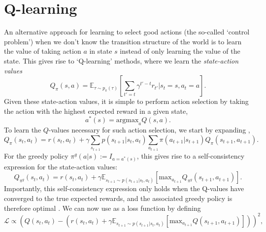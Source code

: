 \section{Q-learning}
\label{sec:q_learning}



An alternative approach for learning to select good actions (the so-called `control problem') when we don't know the transition structure of the world is to learn the value of taking action $a$ in state $s$ instead of only learning the value of the state.
This gives rise to `Q-learning' methods, where we learn the \emph{state-action values}
\begin{equation}
    \label{eq:Q-values}
    Q_\pi(s,a) =  \mathbb{E}_{\tau \sim p_\pi(\tau)} \left [ \sum_{t'=t} \gamma^{t' - t} r_{t'} | s_{t} = s, a_{t} = a \right ].
\end{equation}
Given these state-action values, it is simple to perform action selection by taking the action with the highest expected reward in a given state,
\begin{equation}
    a^*(s) = \text{argmax}_{a} Q(s, a).
\end{equation}
To learn the $Q$-values necessary for such action selection, we start by expanding ,
\begin{equation}
    \label{eq:Q-expanded}
    Q_\pi(s_t,a_t) =  r(s_t, a_t) + \gamma \sum_{s_{t+1}} p(s_{t+1} | s_t, a_t) \sum_{a_{t+1}} \pi(a_{t+1} | s_{t+1}) Q_\pi(s_{t+1}, a_{t+1}).
\end{equation}
For the greedy policy $\pi^g(a|s) := I_{a = a^*(s)}$, this gives rise to a self-consistency expression for the state-action values:
\begin{equation}
    \label{eq:Q-optimal}
    Q_{\pi^g}(s_t,a_t) =  r(s_t, a_t) + \gamma \mathbb{E}_{s_{t+1} \sim p(s_{t+1} | s_t, a_t)} \left [ \text{max}_{a_{t+1}} Q_{\pi^g}(s_{t+1}, a_{t+1}) \right ].
\end{equation}
Importantly, this self-consistency expression only holds when the Q-values have converged to the true expected rewards, and the associated greedy policy is therefore optimal \citep{sutton2018reinforcement}.
We can now use  as a loss function by defining
\begin{equation}
    \mathcal{L} \propto \left (  Q(s_t,a_t) - (r(s_t, a_t) + \gamma \mathbb{E}_{s_{t+1} \sim p(s_{t+1} | s_t, a_t)} \left [ \text{max}_{a_{t+1}} Q(s_{t+1}, a_{t+1}) \right ] ) \right )^2,
\end{equation}
